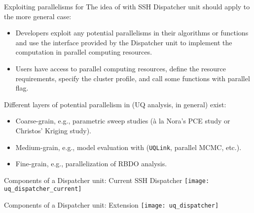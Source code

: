 \documentclass{rsuqbeamernew}
\begin{document}
\begin{frame}[t]{Exploiting parallelisms for \uqlab{}}
  \small  
  The idea of  with SSH Dispatcher unit should apply to
  the more general case:
  \begin{itemize}
    \item {\altx Developers} exploit any potential parallelisms in their
    algorithms or functions and use the interface provided by the Dispatcher
    unit to implement the computation in parallel computing resources.
    \item {\altx Users} have access to parallel computing resources, define the 
    resource requirements, specify the cluster profile, and call some functions
    with parallel flag.
  \end{itemize}
  
  
  Different layers of potential parallelism in \uqlab{} (UQ analysis, in general)
  exist:
  \begin{itemize}
    \item {\altx Coarse-grain}, e.g., parametric sweep studies
    (\`a la Nora's PCE study or Christos' Kriging study).
    \item {\altx Medium-grain}, e.g., model evaluation with 
    (\texttt{UQLink}, parallel MCMC, etc.).
    \item {\altx Fine-grain}, e.g., parallelization of RBDO analysis.
  \end{itemize}

\end{frame}

\begin{frame}[t]{Components of a Dispatcher unit: Current SSH Dispatcher}
  \small
  \texttt{[image: uq\_dispatcher\_current]}
\end{frame}

\begin{frame}[t]{Components of a Dispatcher unit: Extension}
  \small
  \texttt{[image: uq\_dispatcher]}
\end{frame}
\end{document}
